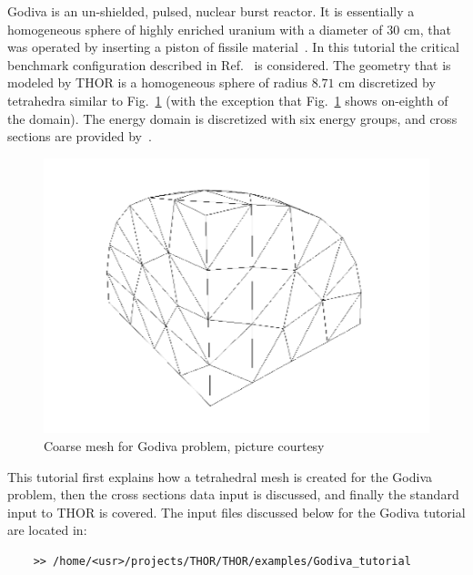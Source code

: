 Godiva is an un-shielded, pulsed, nuclear burst reactor. It is essentially a homogeneous sphere of highly enriched uranium with a diameter of $30$ cm, that was operated by inserting a piston of fissile material~\cite{Godiva1961}. In this tutorial the critical benchmark configuration described in Ref.~\cite{GodivaBenchmark} is considered. The geometry that is modeled by THOR is a homogeneous sphere of radius $8.71$ cm discretized by tetrahedra similar to Fig.~\ref{fig:godiva_coarse} (with the exception that Fig.~\ref{fig:godiva_coarse} shows on-eighth of the domain). The energy domain is discretized with six energy groups, and cross sections are provided by~\cite{GodivaBenchmark}.

\begin{figure}[th]
  \includegraphics[width=1.0\textwidth]{chapters/godivatutorial/figures/godiva_coarse.png}
  \caption{Coarse mesh for Godiva problem, picture courtesy~\cite{FerrerPhD}}
  \label{fig:godiva_coarse}
\end{figure}

This tutorial first explains how a tetrahedral mesh is created for the Godiva problem, then the cross sections data input is discussed, and finally the standard input to THOR is covered.
The input files discussed below for the Godiva tutorial are located in:
\begin{verbatim}
    >> /home/<usr>/projects/THOR/THOR/examples/Godiva_tutorial
\end{verbatim}

